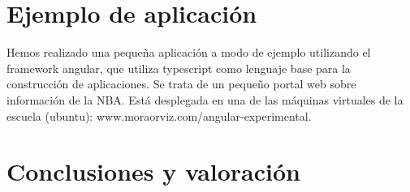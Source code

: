 \documentclass[12pt,twoside,a4paper, spanish]{article}
\begin{document}
    \section{Ejemplo de aplicación}
    
    Hemos realizado una pequeña aplicación a modo de ejemplo utilizando el framework angular, que utiliza typescript como lenguaje base para la construcción de aplicaciones. Se trata de un pequeño portal web sobre información de la NBA. Está desplegada en una de las máquinas virtuales de la escuela (ubuntu): www.moraorviz.com/angular-experimental.
    
    \section{Conclusiones y valoración}
    

	
\end{document}

